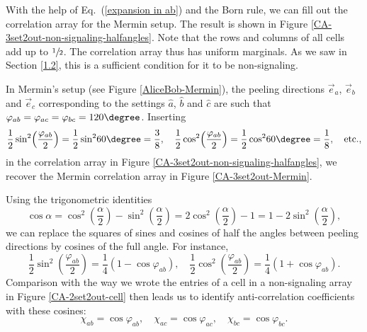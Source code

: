 With the help of Eq.\ (\ref{expansion in ab}) and the Born rule, we can fill out the correlation array for the Mermin setup. The result is shown in Figure \ref{CA-3set2out-non-signaling-halfangles}.  Note that the rows and columns of all cells add up to $\sfrac12$. The correlation array thus has uniform marginals. As we saw in Section \ref{1.2}, this is a sufficient condition for it to be non-signaling. 

In Mermin's setup (see Figure \ref{AliceBob-Mermin}), the peeling directions $\vec{e}_a$, $\vec{e}_b$ and  $\vec{e}_c$ corresponding to the settings $\hat{a}$, $\hat{b}$ and $\hat{c}$ are such that $\varphi_{ab} = \varphi_{ac} = \varphi_{bc} = 120\degree$. Inserting
\begin{equation}
\frac12 \sin^2{\! \left( \frac{\varphi_{ab}}{2}\right)} = \frac12 \sin^2{\! 60\degree} = \frac{3}{8}, 
\quad \frac12 \cos^2{\! \left( \frac{\varphi_{ab}}{2}\right)}  = \frac12 \cos^2{\! 60\degree} = \frac{1}{8}, 
\quad \mathrm{etc.,}
\end{equation}
in the correlation array in Figure \ref{CA-3set2out-non-signaling-halfangles}, we recover the Mermin correlation array in Figure \ref{CA-3set2out-Mermin}.

Using the trigonometric identities
\begin{equation}
\cos{\alpha} = \cos^2{\!\left( \frac{\alpha}{2} \right)} - \sin^2{\!\left( \frac{\alpha}{2} \right)} = 2 \cos^2{\!\left( \frac{\alpha}{2} \right)} -1 = 1 - 2 \sin^2{\!\left( \frac{\alpha}{2} \right)},
\label{trigonometry}
\end{equation}
we can replace the squares of sines and cosines of half the angles between peeling directions by cosines of the full angle. For instance,  
\begin{equation}
\frac12 \sin^2{\!\left(\frac{\varphi_{ab}}{2}\right)} = \frac{1}{4} \left( 1 - \cos{ \varphi_{ab}} \right), \quad
\frac12 \cos^2{\!\left(\frac{\varphi_{ab}}{2}\right)} = \frac{1}{4} \left( 1 + \cos{ \varphi_{ab}} \right).
\label{angle2halfangle}
\end{equation}
Comparison with the way we wrote the entries of a cell in a non-signaling array in Figure \ref{CA-2set2out-cell} then leads us to identify anti-correlation coefficients with these cosines:
\begin{equation}
\chi_{ab} = \cos{\varphi_{ab}}, \quad \chi_{ac} = \cos{\varphi_{ac}}, \quad \chi_{bc} = \cos{\varphi_{bc}}.
\label{chi values repeat}
\end{equation}


